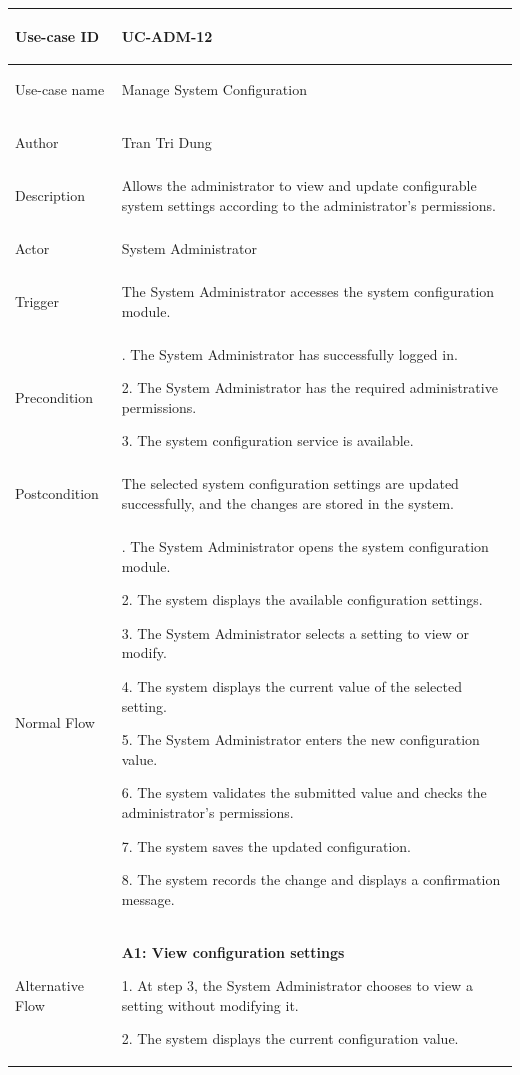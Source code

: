 \begin{longtable}{|>{\bfseries\raggedright\arraybackslash}p{}|>{\raggedright\arraybackslash}p{}|}
\hline
Use-case ID & UC-ADM-12 \\ \hline
Use-case name & Manage System Configuration \\ \hline
Author & Tran Tri Dung \\ \hline
Description & Allows the administrator to view and update configurable system settings according to the administrator's permissions. \\ \hline
Actor & System Administrator \\ \hline
Trigger & The System Administrator accesses the system configuration module. \\ \hline
Precondition &
1. The System Administrator has successfully logged in. \par
2. The System Administrator has the required administrative permissions. \par
3. The system configuration service is available. \\ \hline
Postcondition & The selected system configuration settings are updated successfully, and the changes are stored in the system. \\ \hline
Normal Flow &
1. The System Administrator opens the system configuration module. \par
2. The system displays the available configuration settings. \par
3. The System Administrator selects a setting to view or modify. \par
4. The system displays the current value of the selected setting. \par
5. The System Administrator enters the new configuration value. \par
6. The system validates the submitted value and checks the administrator's permissions. \par
7. The system saves the updated configuration. \par
8. The system records the change and displays a confirmation message. \\ \hline
Alternative Flow &
\textbf{A1: View configuration settings} \par
1. At step 3, the System Administrator chooses to view a setting without modifying it. \par
2. The system displays the current configuration value. \par

\end{longtable}
